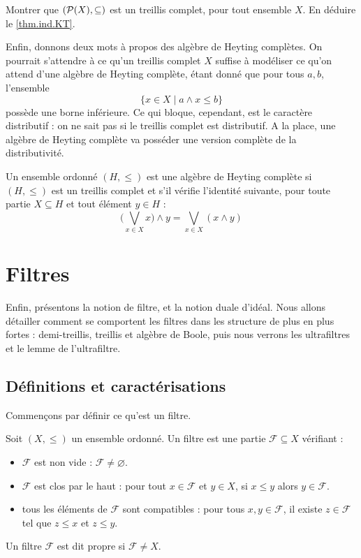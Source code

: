 \begin{exercise}
  Montrer que $(\mathcal{P}(X),\subseteq)$ est un treillis complet, pour tout
  ensemble $X$. En déduire le \cref{thm.ind.KT}.
\end{exercise}

Enfin, donnons deux mots à propos des algèbre de Heyting complètes. On pourrait
s'attendre à ce qu'un treillis complet $X$ suffise à modéliser ce qu'on attend
d'une algèbre de Heyting complète, étant donné que pour tous $a,b$, l'ensemble
\[\{x \in X \mid a \land x \leq b\}\]
possède une borne inférieure. Ce qui bloque, cependant, est le caractère
distributif : on ne sait pas si le treillis complet est distributif. A la place,
une algèbre de Heyting complète va posséder une version complète de la
distributivité.

\begin{definition}
  Un ensemble ordonné $(H,\leq)$ est une algèbre de Heyting complète si
  $(H,\leq)$ est un treillis complet et s'il vérifie l'identité suivante, pour
  toute partie $X\subseteq H$ et tout élément $y \in H$ :
  \[\Bigg(\bigvee_{x\in X}x\Bigg) \land y = \bigvee_{x\in X}(x\land y)\]
\end{definition}

\section{Filtres}

Enfin, présentons la notion de filtre, et la notion duale d'idéal. Nous allons
détailler comment se comportent les filtres dans les structure de plus en plus
fortes : demi-treillis, treillis et algèbre de Boole, puis nous verrons les
ultrafiltres et le lemme de l'ultrafiltre.

\subsection{Définitions et caractérisations}

Commençons par définir ce qu'est un filtre.

\begin{definition}[Filtre]
  Soit $(X,\leq)$ un ensemble ordonné. Un filtre est une partie
  $\mathcal F\subseteq X$ vérifiant :
  \begin{itemize}
  \item $\mathcal F$ est non vide : $\mathcal F \neq\varnothing$.
  \item $\mathcal F$ est clos par le haut : pour tout $x\in \mathcal F$ et
    $y\in X$, si $x\leq y$ alors $y\in \mathcal F$.
  \item tous les éléments de $\mathcal F$ sont compatibles : pour tous
    $x,y\in\mathcal F$, il existe $z\in\mathcal F$ tel que $z\leq x$ et
    $z\leq y$.
  \end{itemize}

  Un filtre $\mathcal F$ est dit propre si $\mathcal F \neq X$.
\end{definition}

